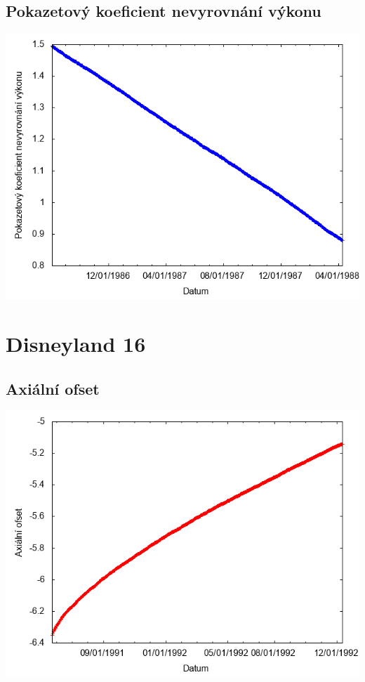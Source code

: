 \documentclass[a4paper,twoside,11pt]{article}
\begin{document}
\subsection*{Pokazetový koeficient nevyrovnání výkonu}
\begin{center}
\includegraphics[width=.8\textwidth]{graphs/Disneyland_15_fha.png}
\end{center}

\newpage
\section*{Disneyland 16}
\subsection*{Axiální ofset}
\begin{center}
\includegraphics[width=.8\textwidth]{graphs/Disneyland_16_ao.png}
\end{center}
\end{document}
